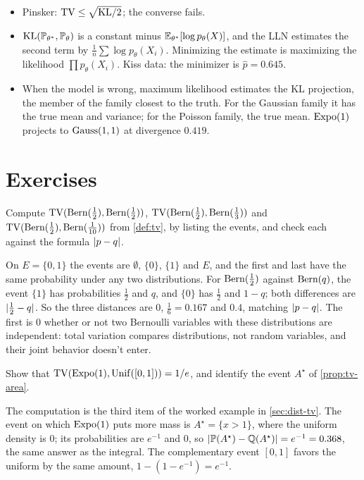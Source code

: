 \begin{itemize}[nosep]
\item Pinsker: $\mathrm{TV} \leq \sqrt{\mathrm{KL}/2}$; the converse fails.
\item $\mathrm{KL}(\mathbb{P}_{\theta^*}, \mathbb{P}_\theta)$ is a constant minus $\operatorname*{\mathbb{E}}_{\theta^*}[\log p_\theta(X)]$, and the LLN estimates the second term by $\frac1n \sum \log p_\theta(X_i)$. Minimizing the estimate is maximizing the likelihood $\prod p_\theta(X_i)$. Kiss data: the minimizer is $\hat{p} = 0.645$.
\item When the model is wrong, maximum likelihood estimates the KL projection, the member of the family closest to the truth. For the Gaussian family it has the true mean and variance; for the Poisson family, the true mean. $\text{Expo}(1)$ projects to $\text{Gauss}(1,1)$ at divergence $0.419$.
\end{itemize}

\section{Exercises}
\label{sec:dist-exercises}

\begin{exercise}
\label{ex:dist-tv-bern}
Compute $\mathrm{TV}(\text{Bern}(\frac12), \text{Bern}(\frac12))$, $\mathrm{TV}(\text{Bern}(\frac12), \text{Bern}(\frac13))$ and $\mathrm{TV}(\text{Bern}(\frac12), \text{Bern}(\frac1{10}))$ from \cref{def:tv}, by listing the events, and check each against the formula $\lvert p - q\rvert$.
\end{exercise}
\begin{solution}
On $E = \{0, 1\}$ the events are $\emptyset$, $\{0\}$, $\{1\}$ and $E$, and the first and last have the same probability under any two distributions. For $\text{Bern}(\frac12)$ against $\text{Bern}(q)$, the event $\{1\}$ has probabilities $\frac12$ and $q$, and $\{0\}$ has $\frac12$ and $1 - q$; both differences are $\lvert\frac12 - q\rvert$. So the three distances are $0$, $\frac16 = 0.167$ and $0.4$, matching $\lvert p - q\rvert$. The first is $0$ whether or not two Bernoulli variables with these distributions are independent: total variation compares distributions, not random variables, and their joint behavior doesn't enter.
\end{solution}

\begin{exercise}
\label{ex:dist-tv-expo-unif}
Show that $\mathrm{TV}(\text{Expo}(1), \mathrm{Unif}([0,1])) = 1/e$, and identify the event $A^\star$ of \cref{prop:tv-area}.
\end{exercise}
\begin{solution}
The computation is the third item of the worked example in \cref{sec:dist-tv}. The event on which $\text{Expo}(1)$ puts more mass is $A^\star = \{x > 1\}$, where the uniform density is $0$; its probabilities are $e^{-1}$ and $0$, so $\lvert\mathbb{P}(A^\star) - \mathbb{Q}(A^\star)\rvert = e^{-1} = 0.368$, the same answer as the integral. The complementary event $[0, 1]$ favors the uniform by the same amount, $1 - (1 - e^{-1}) = e^{-1}$.
\end{solution}

